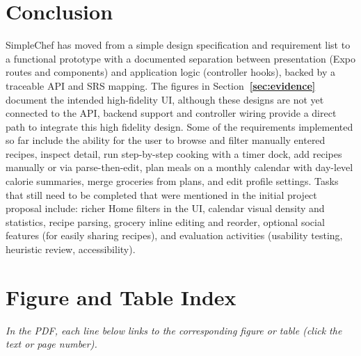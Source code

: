 \documentclass[conference]{IEEEtran}
\begin{document}
\section{Conclusion}
SimpleChef has moved from a simple design specification and requirement list to a functional prototype with a documented separation between presentation (Expo routes and components) and application logic (controller hooks), backed by a traceable API and SRS mapping. The figures in Section\textbf{~\ref{sec:evidence}} document the intended high-fidelity UI, although these designs are not yet connected to the API, backend support and controller wiring provide a direct path to integrate this high fidelity design. Some of the requirements implemented so far include the ability for the user to browse and filter manually entered recipes, inspect detail, run step-by-step cooking with a timer dock, add recipes manually or via parse-then-edit, plan meals on a monthly calendar with day-level calorie summaries, merge groceries from plans, and edit profile settings. Tasks that still need to be completed that were mentioned in the initial project proposal include: richer Home filters in the UI, calendar visual density and statistics, recipe parsing, grocery inline editing and reorder, optional social features (for easily sharing recipes), and evaluation activities (usability testing, heuristic review, accessibility).




\newpage
\section*{Figure and Table Index}
\noindent\textit{In the PDF, each line below links to the corresponding figure or table (click the text or page number).}

\begingroup
\footnotesize
\setlength{\parskip}{0.35em}
\renewcommand{\listfigurename}{\normalsize\normalfont\bfseries Figures}
\renewcommand{\listtablename}{\normalsize\normalfont\bfseries Tables}
\listoffigures
\vspace{1.25em}
\listoftables
\endgroup
\end{document}
